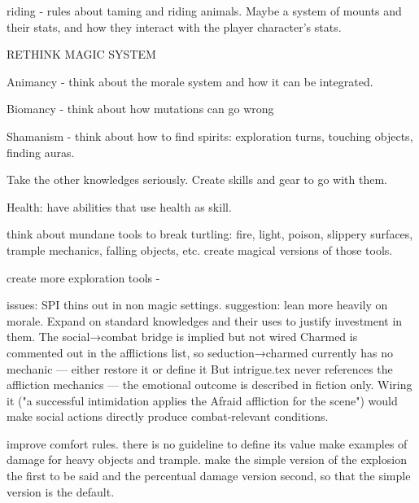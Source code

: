 

riding - rules about taming and riding animals. Maybe a system of mounts and their stats, and how they interact with the player character's stats.



RETHINK MAGIC SYSTEM

Animancy - think about the morale system and how it can be integrated.

Biomancy - think about how mutations can go wrong

Shamanism - think about how to find spirits: exploration turns, touching objects, finding auras.

Take the other knowledges seriously. Create skills and gear to go with them.

Health: have abilities that use health as skill.



think about mundane tools to break turtling:
fire, light, poison, slippery surfaces, trample mechanics, falling objects, etc. 
create magical versions of those tools.

create more exploration tools - 


issues:
SPI thins out in non magic settings. suggestion: lean more heavily on morale.
Expand on standard knowledges and their uses to justify investment in them.
The social→combat bridge is implied but not wired 
Charmed is commented out in the afflictions list, so seduction→charmed currently has
  no mechanic — either restore it or define it
But intrigue.tex never
  references the affliction mechanics — the emotional outcome is described in fiction
  only. Wiring it ("a successful intimidation applies the Afraid affliction for the
  scene") would make social actions directly produce combat-relevant conditions.

  improve comfort rules. there is no guideline to define its value
  make examples of damage for heavy objects and trample.
  make the simple version of the explosion the first to be said and the percentual damage version second, so that the simple version is the default.




